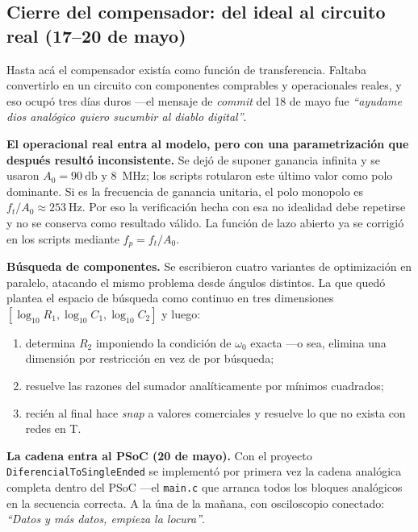 \subsection{Cierre del compensador: del ideal al circuito real (17--20 de mayo)}

Hasta ac\'a el compensador exist\'ia como funci\'on de transferencia. Faltaba
convertirlo en un circuito con componentes comprables y operacionales reales,
y eso ocup\'o tres d\'ias duros ---el mensaje de \emph{commit} del 18 de mayo
fue \emph{``ayudame dios anal\'ogico quiero sucumbir al diablo digital''}.

\textbf{El operacional real entra al modelo, pero con una parametrizaci\'on que
despu\'es result\'o inconsistente.} Se dej\'o de suponer ganancia infinita y se
usaron $A_0 = \SI{90}{\decibel}$ y \SI{8}{\mega\hertz}; los scripts rotularon
este \'ultimo valor como polo dominante. Si es la frecuencia de ganancia unitaria,
el polo monopolo es $f_t/A_0\approx\SI{253}{\hertz}$. Por eso la verificaci\'on
hecha con esa no idealidad debe repetirse y no se conserva como resultado v\'alido. La
funci\'on de lazo abierto ya se corrigi\'o en los scripts mediante $f_p=f_t/A_0$.

\textbf{B\'usqueda de componentes.} Se escribieron cuatro variantes de
optimizaci\'on en paralelo, atacando el mismo problema desde \'angulos
distintos. La que qued\'o plantea el espacio de b\'usqueda como continuo en tres
dimensiones $[\log_{10}R_1, \log_{10}C_1, \log_{10}C_2]$ y luego:

\begin{enumerate}[itemsep=0.15em]
\item determina $R_2$ imponiendo la condici\'on de $\omega_0$ exacta ---o sea,
elimina una dimensi\'on por restricci\'on en vez de por b\'usqueda;
\item resuelve las razones del sumador anal\'iticamente por m\'inimos cuadrados;
\item reci\'en al final hace \emph{snap} a valores comerciales y resuelve lo que
no exista con redes en T.
\end{enumerate}


\textbf{La cadena entra al PSoC (20 de mayo).} Con el proyecto
\texttt{DiferencialToSingleEnded} se implement\'o por primera vez la cadena
anal\'ogica completa dentro del PSoC ---el \texttt{main.c} que arranca todos los
bloques anal\'ogicos en la secuencia correcta. A la \'una de la ma\~nana, con
osciloscopio conectado: \emph{``Datos y m\'as datos, empieza la locura''}.

